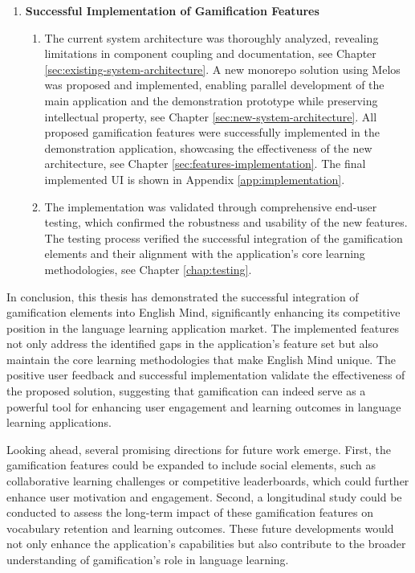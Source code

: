 \begin{enumerate}
    \item \textbf{Successful Implementation of Gamification Features}
    \begin{enumerate}
        \item The current system architecture was thoroughly analyzed, revealing limitations in component coupling and documentation, see Chapter \ref{sec:existing-system-architecture}. A new monorepo solution using Melos was proposed and implemented, enabling parallel development of the main application and the demonstration prototype while preserving intellectual property, see Chapter \ref{sec:new-system-architecture}. All proposed gamification features were successfully implemented in the demonstration application, showcasing the effectiveness of the new architecture, see Chapter \ref{sec:features-implementation}. The final implemented UI is shown in Appendix \ref{app:implementation}.

        \item The implementation was validated through comprehensive end-user testing, which confirmed the robustness and usability of the new features. The testing process verified the successful integration of the gamification elements and their alignment with the application's core learning methodologies, see Chapter \ref{chap:testing}.
    \end{enumerate}
\end{enumerate}

In conclusion, this thesis has demonstrated the successful integration of gamification elements into English Mind, significantly enhancing its competitive position in the language learning application market. The implemented features not only address the identified gaps in the application's feature set but also maintain the core learning methodologies that make English Mind unique. The positive user feedback and successful implementation validate the effectiveness of the proposed solution, suggesting that gamification can indeed serve as a powerful tool for enhancing user engagement and learning outcomes in language learning applications.

Looking ahead, several promising directions for future work emerge. First, the gamification features could be expanded to include social elements, such as collaborative learning challenges or competitive leaderboards, which could further enhance user motivation and engagement. Second, a longitudinal study could be conducted to assess the long-term impact of these gamification features on vocabulary retention and learning outcomes. These future developments would not only enhance the application's capabilities but also contribute to the broader understanding of gamification's role in language learning.
